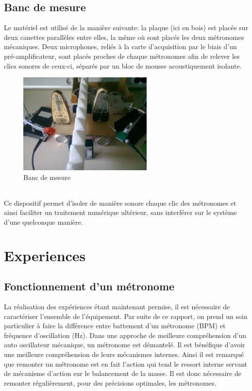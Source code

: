 \documentclass[a4paper,11pt]{report}
\begin{document}
\section{Banc de mesure}

Le matériel est utilisé de la manière suivante: la plaque (ici en bois) est placée sur deux canettes parallèles entre elles, la même où sont placés les deux métronomes mécaniques. Deux microphones, reliés à la carte d'acquisition par le biais d'un pré-amplificateur, sont placés proches de chaque métronomes afin de relever les clics sonores de ceux-ci, séparés par un bloc de mousse acoustiquement isolante.\\
\begin{figure}[h]
\centering
\includegraphics[width=0.6\textwidth]{BancMesure}
\caption{Banc de mesure}\label{Banc}
\end{figure}\\
Ce dispositif permet d'isoler de manière sonore chaque clic des métronomes et ainsi faciliter un traitement numérique ultérieur, sans interférer sur le système d'une quelconque manière.
\chapter{Experiences}
\section{Fonctionnement d'un métronome}
La réalisation des expériences étant maintenant permise, il est nécessaire de caractériser  l'ensemble de l'équipement. Par suite de ce rapport, on prend un soin particulier à faire la différence entre battement d'un métronome (BPM) et fréquence d'oscillation (Hz). Dans une approche de meilleure compréhension d'un auto oscillateur mécanique, un métronome est  démantelé. Il est bénéfique d'avoir une meilleure compréhension de leurs mécanismes internes. Ainsi il est remarqué que remonter un métronome est en fait l'action qui tend le ressort interne servant de mécanisme d'action sur le balancement de la masse. Il est donc nécessaire de remonter régulièrement, pour des précisions optimales, les métronomes. \\
\end{document}
